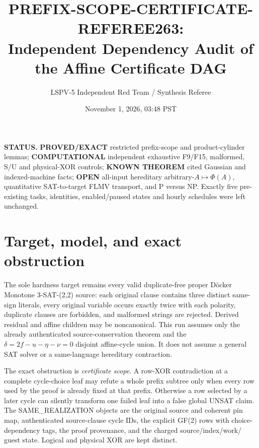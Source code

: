 \documentclass[11pt]{article}
\title{PREFIX-SCOPE-CERTIFICATE-REFEREE263:\\Independent Dependency Audit of the Affine Certificate DAG}
\author{LSPV-5 Independent Red Team / Synthesis Referee}
\date{November 1, 2026, 03:48 PST}
\begin{document}
\maketitle

\noindent\textbf{STATUS.}
\textbf{PROVED/EXACT} restricted prefix-scope and product-cylinder lemmas;
\textbf{COMPUTATIONAL} independent exhaustive F9/F15, malformed, S/U and
physical-XOR controls; \textbf{KNOWN THEOREM} cited Gaussian and indexed-machine
facts; \textbf{OPEN} all-input hereditary arbitrary-$A\mapsto\Phi(A)$,
quantitative SAT-to-target FLMV transport, and P versus NP. Exactly five
pre-existing tasks, identities, enabled/paused states and hourly schedules were
left unchanged.

\section{Target, model, and exact obstruction}
The sole hardness target remains every valid duplicate-free proper D\"ocker
Monotone 3-SAT-(2,2) source: each original clause contains three distinct
same-sign literals, every original variable occurs exactly twice with each
polarity, duplicate clauses are forbidden, and malformed strings are rejected.
Derived residual and affine children may be noncanonical. This run assumes only
the already authenticated source-conservation theorem and the
$\delta=2f-u-\eta-\nu=0$ disjoint affine-cycle union. It does not assume a
general SAT solver or a same-language hereditary contraction.

The exact obstruction is \emph{certificate scope}. A row-XOR contradiction at
a complete cycle-choice leaf may refute a whole prefix subtree only when every
row used by the proof is already fixed at that prefix. Otherwise a row selected
by a later cycle can silently transform one failed leaf into a false global
UNSAT claim. The SAME\_REALIZATION objects are the original source and coherent
pin map, authenticated source-clause cycle IDs, the explicit GF(2) rows with
choice-dependency tags, the proof provenance, and the charged source/index/work/
guest state. Logical and physical XOR are kept distinct.
\end{document}
